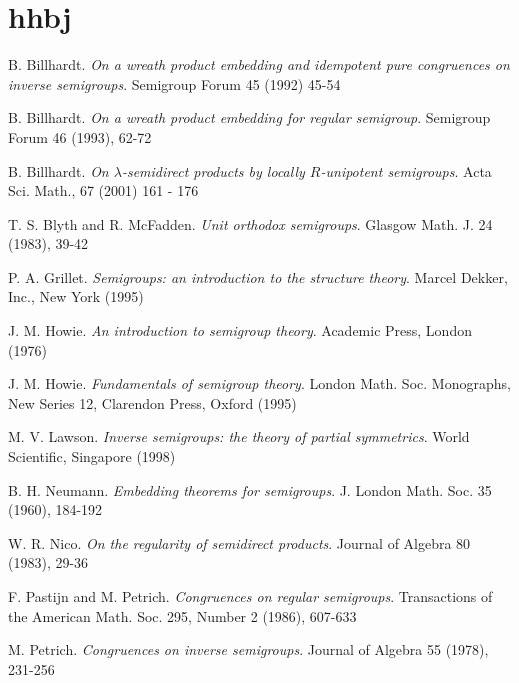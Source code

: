 \documentclass[12pt,a4paper,twoside]{report}
\theoremstyle{remark}
\theoremstyle{example}
\begin{document}

\newpage
\thispagestyle{empty}
\null


\newpage
\thispagestyle{empty}
\null







\chapter{hhbj}
\newpage
{}
\setcounter{section}{0}
\begin{thebibliography}{x}

 B. Billhardt. {\it On a wreath product embedding and idempotent pure congruences on inverse semigroups}. Semigroup Forum 45 (1992) 45-54

 B. Billhardt. {\it On a wreath product embedding for regular semigroup}. Semigroup Forum 46 (1993), 62-72

 B. Billhardt. {\it On $\lambda$-semidirect  products by locally $R$-unipotent semigroups}. Acta Sci. Math., 67 (2001) 161 - 176

 T. S. Blyth and R. McFadden. {\it Unit orthodox semigroups}. Glasgow Math. J. 24 (1983), 39-42

 P. A. Grillet. {\it Semigroups: an introduction to the structure theory}. Marcel Dekker, Inc., New York (1995)

 J. M. Howie. {\it An introduction to semigroup theory}. Academic Press, London (1976)

 J. M. Howie. {\it Fundamentals of semigroup theory}. London Math. Soc. Monographs, New Series 12, Clarendon Press, Oxford (1995)

 M. V. Lawson. {\it Inverse semigroups: the theory of partial symmetrics}. World Scientific, Singapore (1998)

 B. H. Neumann. {\it Embedding theorems for semigroups}. J. London Math. Soc. 35 (1960), 184-192

 W. R. Nico. {\it On the regularity of semidirect products}. Journal of Algebra 80 (1983), 29-36

 F. Pastijn and M. Petrich. {\it Congruences on regular semigroups}. Transactions of the American Math. Soc. 295, Number 2 (1986), 607-633

 M. Petrich. {\it Congruences on inverse semigroups}. Journal of Algebra 55 (1978), 231-256


\end{thebibliography}
\end{document}
